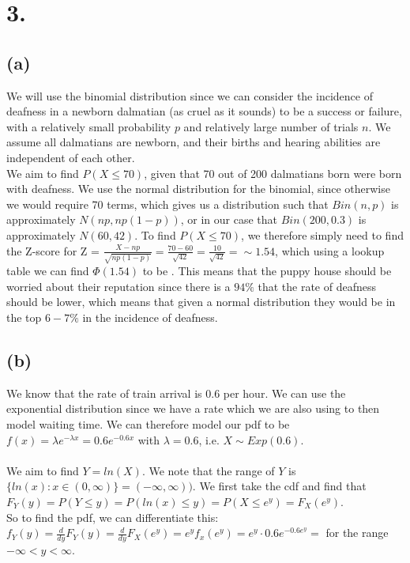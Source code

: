 \documentclass{article}
\begin{document}
\section*{3.}
{\Large

\subsection*{(a)}
We will use the binomial distribution since we can consider the incidence of deafness in a newborn dalmatian (as cruel as it sounds) to be a success or failure, with a relatively small probability $p$ and relatively large number of trials $n$. We assume all dalmatians are newborn, and their births and hearing abilities are independent of each other. \\
We aim to find $P(X \leq 70)$, given that 70 out of 200 dalmatians born were born with deafness. We use the normal distribution for the binomial, since otherwise we would require 70 terms, which gives us a distribution such that $Bin(n,p)$ is approximately $N(np, np(1-p))$, or in our case that $Bin(200, 0.3)$ is approximately $N(60, 42)$. To find $P(X \leq 70)$, we therefore simply need to find the Z-score for Z = $\frac{X - np}{\sqrt{np(1-p)}} = \frac{70-60}{\sqrt{42}} = \frac{10}{\sqrt{42}} = \sim 1.54$, which using a lookup table we can find $\Phi(1.54)$ to be . This means that the puppy house should be worried about their reputation since there is a $94\%$ that the rate of deafness should be lower, which means that given a normal distribution they would be in the top $6-7\%$ in the incidence of deafness.

\subsection*{(b)}
We know that the rate of train arrival is 0.6 per hour. We can use the exponential distribution since we have a rate which we are also using to then model waiting time. We can therefore model our pdf to be $f(x) = \lambda e^{-\lambda x} = 0.6e^{-0.6x}$ with $\lambda = 0.6$, i.e. $X \sim Exp(0.6)$. \\ \\
We aim to find $Y = ln(X)$. We note that the range of $Y$ is $\{ln(x) : x \in (0, \infty)\} = (-\infty, \infty))$. We first take the cdf and find that \\
$F_Y(y) = P(Y \leq y) = P(ln(x) \leq y) = P(X \leq e^y) = F_X(e^y)$.
\\ So to find the pdf, we can differentiate this: \\
$f_Y(y) = \frac{d}{dy}F_Y(y) = \frac{d}{dy}F_X(e^y) = e^y f_x(e^y) = e^y \cdot 0.6e^{-0.6e^y} = $  for the range $-\infty < y <\infty$.

}
\end{document}
